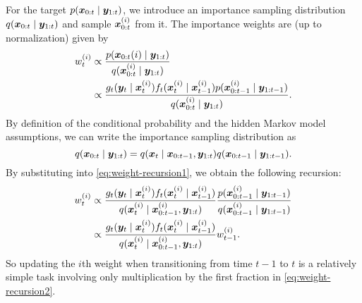 For the target $p(\bm{x}_{0:t} \mid \bm{y}_{1:t})$, we introduce an importance sampling distribution ${q(\bm{x}_{0:t} \mid \bm{y}_{1:t})}$ and sample $\bm{x}_{0:t}^{(i)}$ from it. The importance weights are (up to normalization) given by
\begin{equation} \label{eq:weight-recursion1}
\begin{split}
w_t^{(i)} & \propto \frac{p(\bm{x}_{0:t}{(i)} \mid \bm{y}_{1:t})}{q(\bm{x}_{0:t}^{(i)} \mid \bm{y}_{1:t})} \\
& \propto \frac{g_t(\bm{y}_t \mid \bm{x}_t^{(i)}) f_t(\bm{x}_t^{(i)} \mid \bm{x}_{t-1}^{(i)}) p(\bm{x}_{0:t-1}^{(i)} \mid \bm{y}_{1:t-1})}{q(\bm{x}_{0:t}^{(i)} \mid \bm{y}_{1:t})}.
\end{split}
\end{equation}
By definition of the conditional probability and the hidden Markov model assumptions, we can write the importance sampling distribution as
\begin{equation*}
q(\bm{x}_{0:t} \mid \bm{y}_{1:t}) = q(\bm{x}_t \mid \bm{x}_{0:t-1}, \bm{y}_{1:t}) q(\bm{x}_{0:t-1} \mid \bm{y}_{1:t-1}).
\end{equation*}
By substituting into \eqref{eq:weight-recursion1}, we obtain the following recursion:
\begin{equation} \label{eq:weight-recursion2}
\begin{split}
w_t^{(i)} & \propto \frac{g_t(\bm{y}_t \mid \bm{x}_t^{(i)}) f_t(\bm{x}_t^{(i)} \mid \bm{x}_{t-1}^{(i)})}{q(\bm{x}_t^{(i)} \mid \bm{x}_{0:t-1}^{(i)}, \bm{y}_{1:t})} \frac{p(\bm{x}_{0:t-1}^{(i)} \mid \bm{y}_{1:t-1})}{q(\bm{x}_{0:t-1}^{(i)} \mid \bm{y}_{1:t-1})} \\
& \propto \frac{g_t(\bm{y}_t \mid \bm{x}_t^{(i)}) f_t(\bm{x}_t^{(i)} \mid \bm{x}_{t-1}^{(i)})}{q(\bm{x}_t^{(i)} \mid \bm{x}_{0:t-1}^{(i)}, \bm{y}_{1:t})} w_{t-1}^{(i)}.
\end{split}
\end{equation}
So updating the $i$th weight when transitioning from time $t-1$ to $t$ is a relatively simple task involving only multiplication by the first fraction in \eqref{eq:weight-recursion2}.

